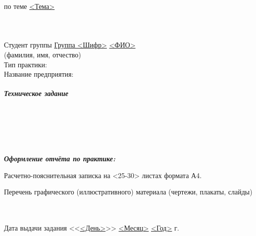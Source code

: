 \documentclass[10pt]{templateTaskBMSTU}
\begin{document}
	\begin{flushleft}
		по теме  \uline{<Тема>\hfill}
		\baselineskip=17pt
		\\ \uline{ \hfill}
		\\ \uline{ \hfill}
		\\ \baselineskip=9pt\hfill
		\\ \baselineskip=10pt Студент группы  \uline{\hspace*{0.5cm}}\uline{Группа <Шифр>}\uline{\hspace*{0.5cm}}
		\center \baselineskip=7pt \uline{ \hfill} 
		\\ \fontsize{10pt}{\baselineskip}\selectfont(фамилия, имя, отчество)
		\baselineskip=15pt
		 \\Тип практики: \uline{ \hfill} %
		\baselineskip=15pt
		\\  Название предприятия: \uline{ \hfill} %
		\\ \hfill
		\\ \textbf{\textit{Техническое задание}} \uline{\hfill}
		\\ \uline{\hfill}
		\\ \uline{\hfill}
		\\ \uline{\hfill}
		\\ \uline{\hfill}
		\\ \uline{\hfill}
		\\ \uline{\hfill}
	\end{flushleft}

	\begin{flushleft}
		\baselineskip=14pt
		\textbf{\textit{Оформление отчёта по практике:}}
		
		Расчетно-пояснительная записка на <25-30> листах формата А4. %

		Перечень графического (иллюстративного) материала (чертежи, плакаты, слайды)
		\\ \uline{\hfill} \baselineskip=15pt
		\\ \uline{\hfill}
		\\ \uline{\hfill}
	\end{flushleft}

	\begin{flushleft}
		Дата выдачи задания <<\uline{<День>}>> \uline{<Месяц>} \uline{<Год>} г. %
	\end{flushleft}
\end{document}
